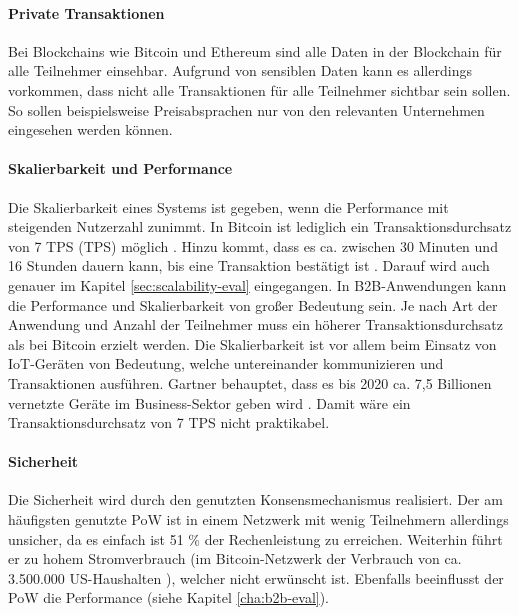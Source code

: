 \paragraph{Private Transaktionen}
Bei Blockchains wie Bitcoin und Ethereum sind alle Daten in der Blockchain für alle Teilnehmer einsehbar. Aufgrund von sensiblen Daten kann es allerdings vorkommen, dass nicht alle Transaktionen für alle Teilnehmer sichtbar sein sollen. So sollen beispielsweise Preisabsprachen nur von den relevanten Unternehmen eingesehen werden können.

\paragraph{Skalierbarkeit und Performance}
Die Skalierbarkeit eines Systems ist gegeben, wenn die Performance mit steigenden Nutzerzahl zunimmt. In Bitcoin ist lediglich ein Transaktionsdurchsatz von 7 \acl{TPS} (\acs{TPS}) möglich \cite{ZhengBlockchainChallengesOpportunities2017}. Hinzu kommt, dass es ca. zwischen 30 Minuten und 16 Stunden dauern kann, bis eine Transaktion bestätigt ist \cite{BuchkoHowLongBitcoin2017}. Darauf wird auch genauer im Kapitel \ref{sec:scalability-eval} eingegangen. In \acs{B2B}-Anwendungen kann die Performance und Skalierbarkeit von großer Bedeutung sein. Je nach Art der Anwendung und Anzahl der Teilnehmer muss ein höherer Transaktionsdurchsatz als bei Bitcoin erzielt werden. Die Skalierbarkeit ist vor allem beim Einsatz von \acs{IoT}-Geräten von Bedeutung, welche untereinander kommunizieren und Transaktionen ausführen. Gartner behauptet, dass es bis 2020 ca. 7,5 Billionen vernetzte Geräte im Business-Sektor geben wird \cite{RobGartnerSaysBillion2017}. Damit wäre ein Transaktionsdurchsatz von 7 \acs{TPS} nicht praktikabel.

\paragraph{Sicherheit}
Die Sicherheit wird durch den genutzten Konsensmechanismus realisiert. Der am häufigsten genutzte \acs{PoW} ist in einem Netzwerk mit wenig Teilnehmern allerdings unsicher, da es einfach ist 51 \% der Rechenleistung zu erreichen. Weiterhin führt er zu hohem Stromverbrauch (im Bitcoin-Netzwerk der Verbrauch von ca. 3.500.000 US-Haushalten \cite{DigiconomistBitcoinEnergyConsumption}), welcher nicht erwünscht ist. Ebenfalls beeinflusst der \acs{PoW} die Performance (siehe Kapitel \ref{cha:b2b-eval}).



